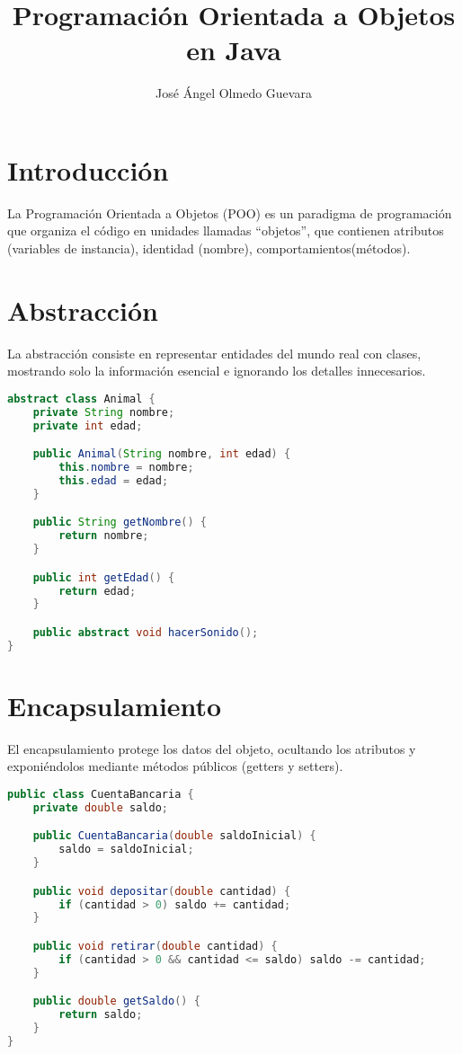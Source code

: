 \documentclass[12pt]{article}
\title{\Huge Programación Orientada a Objetos en Java}
\author{José Ángel Olmedo Guevara}
\date{}
\begin{document}
\maketitle

\section*{Introducción}
La Programación Orientada a Objetos (POO) es un paradigma de programación que organiza el código en unidades llamadas ``objetos'', que contienen atributos (variables de instancia), identidad (nombre), comportamientos(métodos).

\section{Abstracción}
La abstracción consiste en representar entidades del mundo real con clases, mostrando solo la información esencial e ignorando los detalles innecesarios.


\begin{lstlisting}[language=Java, caption={Ejemplo de abstracción}]
abstract class Animal {
    private String nombre;
    private int edad;

    public Animal(String nombre, int edad) {
        this.nombre = nombre;
        this.edad = edad;
    }

    public String getNombre() {
        return nombre;
    }

    public int getEdad() {
        return edad;
    }

    public abstract void hacerSonido();
}
\end{lstlisting}

\newpage
\section{Encapsulamiento}
El encapsulamiento protege los datos del objeto, ocultando los atributos y exponiéndolos mediante métodos públicos (getters y setters).

\begin{lstlisting}[language=Java, caption={Encapsulamiento con atributos privados}]
public class CuentaBancaria {
    private double saldo;

    public CuentaBancaria(double saldoInicial) {
        saldo = saldoInicial;
    }

    public void depositar(double cantidad) {
        if (cantidad > 0) saldo += cantidad;
    }

    public void retirar(double cantidad) {
        if (cantidad > 0 && cantidad <= saldo) saldo -= cantidad;
    }

    public double getSaldo() {
        return saldo;
    }
}
\end{lstlisting}
\newpage
\end{document}
